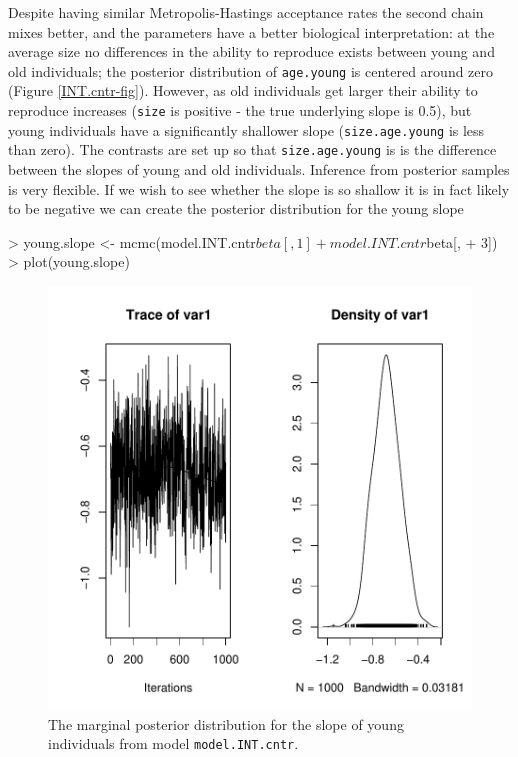\documentclass{article}
\begin{document}
Despite having similar Metropolis-Hastings acceptance rates the second chain mixes better, and the parameters have a better biological interpretation: at the average size no differences in the ability to reproduce exists between young and old individuals;  the posterior distribution of \texttt{age.young} is centered around zero (Figure \ref{INT.cntr-fig}).  However, as old individuals get larger their ability to reproduce increases (\texttt{size} is positive - the true underlying slope is 0.5), but young individuals have a significantly shallower slope (\texttt{size.age.young} is less than zero).  The contrasts are set up so that \texttt{size.age.young} is is the difference between the slopes of young and old individuals.  Inference from posterior samples is very flexible.  If we wish to see whether the slope is so shallow it is in fact likely to be negative we can create the posterior distribution for the young slope

\begin{Schunk}
\begin{Sinput}
> young.slope <- mcmc(model.INT.cntr$beta[, 1] + model.INT.cntr$beta[, 
+     3])
> plot(young.slope)
\end{Sinput}
\end{Schunk}


\begin{figure}[!h]
\begin{center}
\includegraphics{Tutorial-065}
\end{center}
\caption{The marginal posterior distribution for the slope of young individuals from model \texttt{model.INT.cntr}.}
\label{ys-fig}
\end{figure}
\end{document}

